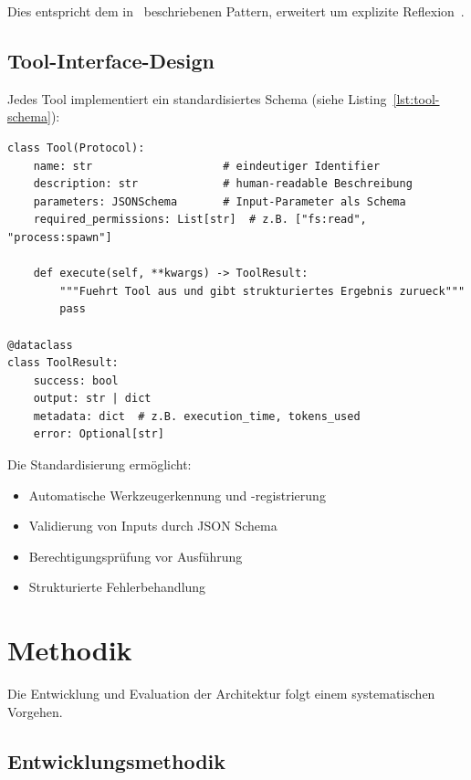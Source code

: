 Dies entspricht dem in~\cite{yao2023react} beschriebenen Pattern, erweitert um explizite Reflexion~\cite{shinn2023reflexion}.

\subsection{Tool-Interface-Design}

Jedes Tool implementiert ein standardisiertes Schema (siehe Listing~\ref{lst:tool-schema}):

\begin{lstlisting}[style=Python, caption={Tool-Interface-Schema (Pseudocode)}, label={lst:tool-schema}]
class Tool(Protocol):
    name: str                    # eindeutiger Identifier
    description: str             # human-readable Beschreibung
    parameters: JSONSchema       # Input-Parameter als Schema
    required_permissions: List[str]  # z.B. ["fs:read", "process:spawn"]
    
    def execute(self, **kwargs) -> ToolResult:
        """Fuehrt Tool aus und gibt strukturiertes Ergebnis zurueck"""
        pass

@dataclass
class ToolResult:
    success: bool
    output: str | dict
    metadata: dict  # z.B. execution_time, tokens_used
    error: Optional[str]
\end{lstlisting}

Die Standardisierung ermöglicht:
\begin{sloppypar}
\begin{itemize}
  \item Automatische Werkzeugerkennung und -registrierung
  \item Validierung von Inputs durch JSON Schema
  \item Berechtigungsprüfung vor Ausführung
  \item Strukturierte Fehlerbehandlung
\end{itemize}
\end{sloppypar}

\section{Methodik}

Die Entwicklung und Evaluation der Architektur folgt einem systematischen Vorgehen.

\subsection{Entwicklungsmethodik}

